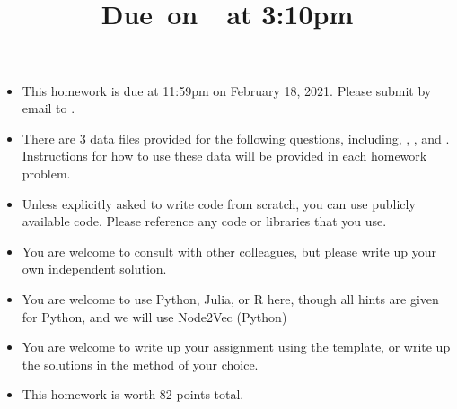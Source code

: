 \documentclass{article}
\title{
    \vspace{2in}
    \textmd{\textbf{\hmwkClass\hmwkTitle}}\\
    \normalsize\vspace{0.1in}\small{Due\ on\ \hmwkDueDate\ at 3:10pm}\\
    \vspace{3in}
}
\author{\hmwkAuthorName}
\date{}
\begin{document}

\begin{itemize}
\item This homework is due at 11:59pm on February 18, 2021. Please submit by email to . 
\item There are 3 data files provided for the following questions, including, , , and . Instructions for how to use these data will be provided in each homework problem. 
\item Unless explicitly asked to write code from scratch, you can use publicly available code. Please reference any code or libraries that you use.
\item You are welcome to consult with other colleagues, but please write up your own independent solution. 
\item You are welcome to use Python, Julia, or R here, though all hints are given for Python, and we will use Node2Vec (Python)
\item You are welcome to write up your assignment using the  template, or write up the solutions in the method of your choice. 
\item This homework is worth 82 points total. 
\end{itemize}
\end{document}
